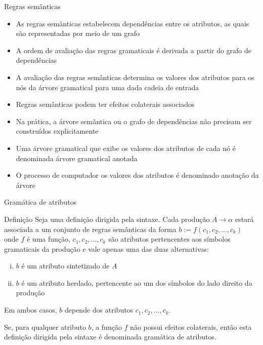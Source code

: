 \begin{frame}[fragile]{Regras semânticas}

    \begin{itemize}
        \item As regras semânticas estabelecem dependências entre os atributos, as quais são representadas por meio de um grafo
        \pause

        \item A ordem de avaliação das regras gramaticais é derivada a partir do grafo de dependências
        \pause

        \item A avaliação das regras semânticas determina os valores dos atributos para os nós da árvore gramatical para uma dada 
            cadeia de entrada
        \pause

        \item Regras semânticas podem ter efeitos colaterais associados
        \pause

        \item Na prática, a árvore semãntica ou o grafo de dependências não precisam ser construídos explicitamente
        \pause

        \item Uma árvore gramatical que exibe os valores dos atributos de cada nó é denominada árvore gramatical anotada
        \pause

        \item O processo de computador os valores dos atributos é denominado anotação da árvore
    \end{itemize}

\end{frame}

\begin{frame}[fragile]{Gramática de atributos}

    \begin{block}{Definição}
        Seja uma definição dirigida pela sintaxe. Cada produção $A\to \alpha$ estará associada a um conjunto de regras semânticas da
        forma $b := f(c_1, c_2, \ldots, c_k)$ onde $f$ é uma função, $c_1, c_2, \ldots, c_k$ são atributos pertencentes aos símbolos
        gramaticais da produção e vale apenas uma das duas alternativas:
        \begin{enumerate}[(i)]
            \item $b$ é um atributo sintetizado de $A$
            \item $b$ é um atributo herdado, pertencente ao um dos símbolos do lado direito da produção
        \end{enumerate}
        Em ambos casos, $b$ depende dos atributos $c_1, c_2, \ldots, c_k$.

        \vspace{0.1in}
        Se, para qualquer atributo $b$, a função $f$ não possui efeitos colaterais, então esta definição dirigida pela sintaxe é 
        denominada gramática de atributos.
    \end{block}

\end{frame}

